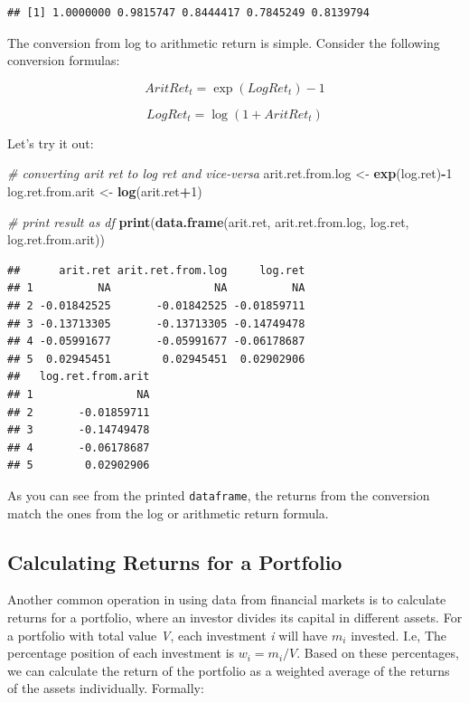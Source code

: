\documentclass[11pt,]{book}
\newenvironment{Shaded}{\begin{snugshade}}{\end{snugshade}}
\newcommand{\KeywordTok}[1]{\textcolor[rgb]{0.27,0.27,0.27}{\textbf{#1}}}
\newcommand{\DecValTok}[1]{\textcolor[rgb]{0.06,0.06,0.06}{#1}}
\newcommand{\StringTok}[1]{\textcolor[rgb]{0.5,0.5,0.5}{#1}}
\newcommand{\CommentTok}[1]{\textcolor[rgb]{0.56,0.35,0.01}{\textit{#1}}}
\newcommand{\OperatorTok}[1]{\textcolor[rgb]{0.81,0.36,0.00}{\textbf{#1}}}
\newcommand{\NormalTok}[1]{#1}
\begin{document}
\begin{verbatim}
## [1] 1.0000000 0.9815747 0.8444417 0.7845249 0.8139794
\end{verbatim}

The conversion from log to arithmetic return is simple. Consider the
following conversion formulas:

\[AritRet_t = \exp(LogRet _t)-1 \]

\[LogRet _t = \log(1+AritRet _t)\]

Let's try it out:

\begin{Shaded}
\begin{Highlighting}[]
\CommentTok{# converting arit ret to log ret and vice-versa}
\NormalTok{arit.ret.from.log <-}\StringTok{ }\KeywordTok{exp}\NormalTok{(log.ret)}\OperatorTok{-}\DecValTok{1}
\NormalTok{log.ret.from.arit <-}\StringTok{ }\KeywordTok{log}\NormalTok{(arit.ret}\OperatorTok{+}\DecValTok{1}\NormalTok{)}

\CommentTok{# print result as df}
\KeywordTok{print}\NormalTok{(}\KeywordTok{data.frame}\NormalTok{(arit.ret, arit.ret.from.log,}
\NormalTok{                 log.ret, log.ret.from.arit))}
\end{Highlighting}
\end{Shaded}

\begin{verbatim}
##      arit.ret arit.ret.from.log     log.ret
## 1          NA                NA          NA
## 2 -0.01842525       -0.01842525 -0.01859711
## 3 -0.13713305       -0.13713305 -0.14749478
## 4 -0.05991677       -0.05991677 -0.06178687
## 5  0.02945451        0.02945451  0.02902906
##   log.ret.from.arit
## 1                NA
## 2       -0.01859711
## 3       -0.14749478
## 4       -0.06178687
## 5        0.02902906
\end{verbatim}

As you can see from the printed \texttt{dataframe}, the returns from the
conversion match the ones from the log or arithmetic return formula.

\subsection{Calculating Returns for a
Portfolio}\label{calculating-returns-for-a-portfolio}

Another common operation in using data from financial markets is to
calculate returns for a portfolio, where an investor divides its capital
in different assets. For a portfolio with total value \emph{V}, each
investment \emph{i} will have \(m_i\) invested. I.e, The percentage
position of each investment is \(w_i = m_i/V\). Based on these
percentages, we can calculate the return of the portfolio as a weighted
average of the returns of the assets individually. Formally:
\end{document}
